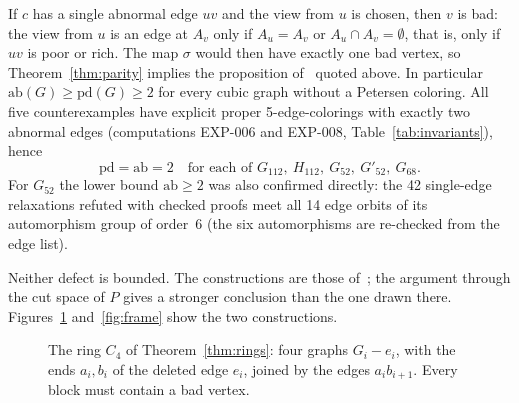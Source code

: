 \documentclass[11pt]{article}
\theoremstyle{definition}
\theoremstyle{remark}
\newcommand{\PG}{P}
\newcommand{\Gmain}{G_{112}}
\newcommand{\Gsym}{H_{112}}
\newcommand{\Gfty}{G_{52}}
\newcommand{\Gftyb}{G'_{52}}
\newcommand{\Gsix}{G_{68}}
\newcommand{\pd}{\mathrm{pd}}
\newcommand{\ab}{\mathrm{ab}}
\begin{document}
If $c$ has a single abnormal edge $uv$ and the view from $u$ is chosen, then $v$ is bad: the view
from $u$ is an edge at $A_v$ only if $A_u = A_v$ or $A_u \cap A_v = \emptyset$, that is, only if
$uv$ is poor or rich. The map $\sigma$ would then have exactly one bad vertex, so
Theorem~\ref{thm:parity} implies the proposition of~\cite{MMM2021} quoted above. In particular
$\ab(G) \ge \pd(G) \ge 2$ for every cubic graph without a Petersen coloring. All five
counterexamples have explicit proper 5-edge-colorings with exactly two abnormal
edges (computations EXP-006 and EXP-008, Table~\ref{tab:invariants}), hence
\[
\pd = \ab = 2 \quad\text{for each of } \Gmain,\ \Gsym,\ \Gfty,\ \Gftyb,\ \Gsix .
\]
For $\Gfty$ the lower bound $\ab \ge 2$ was also confirmed directly: the 42 single-edge
relaxations refuted with checked proofs meet all 14 edge orbits of its automorphism group of
order~6 (the six automorphisms are re-checked from the edge list).

\begin{table}[p]\centering\scriptsize\setlength{\tabcolsep}{3pt}

\caption{Invariants of the five counterexamples with the computation that produces each row. S:
satisfiable, witness re-verified from the graph alone; U: unsatisfiable, DRAT proof checked by
\texttt{drat-trim}. $^{a}$ Not run as a separate instance: three covering matchings form a proper
3-edge-coloring, which the refuted Petersen coloring excludes.}\label{tab:invariants}
\end{table}

Neither defect is bounded. The constructions are those of~\cite{MMM2021}; the argument through the
cut space of $\PG$ gives a stronger conclusion than the one drawn there. Figures~\ref{fig:ring}
and~\ref{fig:frame} show the two constructions.

\begin{figure}[htbp]\centering
{}
\caption{The ring $C_4$ of Theorem~\ref{thm:rings}: four graphs $G_i - e_i$, with the ends $a_i,
b_i$ of the deleted edge $e_i$, joined by the edges $a_ib_{i+1}$. Every block must contain a bad
vertex.}\label{fig:ring}
\end{figure}
\end{document}
